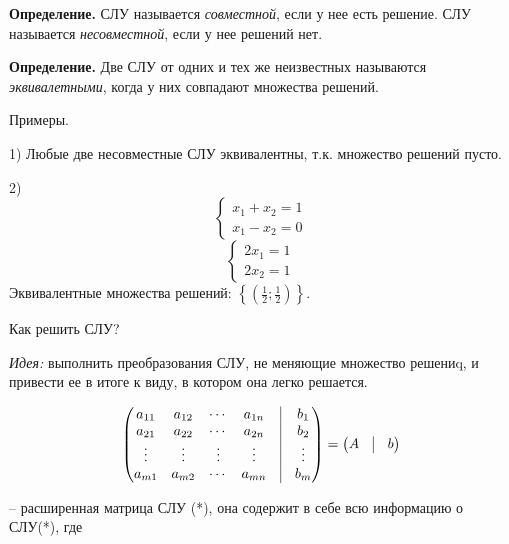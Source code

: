 \vspace{\baselineskip}
\textbf{Определение.} СЛУ называется \textit{совместной}, если у нее есть решение. СЛУ называется \textit{несовместной}, если у нее решений нет.

\vspace{\baselineskip}
\textbf{Определение.} Две СЛУ от одних и тех же неизвестных называются \textit{эквивалетными}, когда у них совпадают множества решений.

\vspace{\baselineskip}
Примеры.

1) Любые две несовместные СЛУ эквивалентны, т.к. множество решений пусто.

2) 
\begin{equation*}
	\left\{
		\begin{aligned}
        x_1 + x_2 = 1 \\
        x_1 - x_2 = 0
		\end{aligned}
	\right. 
\end{equation*}
\begin{equation*}
    \left\{
		\begin{aligned}
        2x_1 = 1 \\
        2x_2 = 1
		\end{aligned}
	\right.
\end{equation*}
Эквивалентные множества решений: $ \left\{ \left( \frac{1}{2} ; \frac{1}{2} \right) \right\}$.

\vspace{\baselineskip}
Как решить СЛУ?

\textit{Идея:} выполнить преобразования СЛУ, не меняющие множество решениq, и привести ее в итоге к виду, в котором она легко решается.

\begin{equation*}
	\begin{pmatrix}
		a_{11} & a_{12} & \cdots & a_{1n} & \vrule & b_1 \\
		a_{21} & a_{22} & \cdots & a_{2n} & \vrule & b_2 \\
       \vdots & \vdots & \vdots& \vdots & \vrule & \vdots\\ 
       a_{m1} & a_{m2} & \cdots & a_{mn} & \vrule & b_m
	\end{pmatrix}
    =
    \begin{pmatrix}
    	A & \vrule & b
	\end{pmatrix}
\end{equation*}

-- расширенная матрица СЛУ (*), она содержит в себе всю информацию о СЛУ(*), где 

